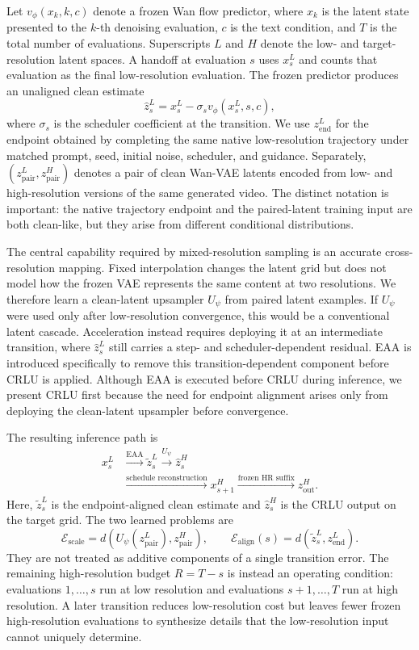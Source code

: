Let \(v_\phi(x_k,k,c)\) denote a frozen Wan flow predictor, where \(x_k\)
is the latent state presented to the \(k\)-th denoising evaluation, \(c\) is
the text condition, and \(T\) is the total number of evaluations. Superscripts
\(L\) and \(H\) denote the low- and target-resolution latent spaces. A handoff
at evaluation \(s\) uses \(x_s^L\) and counts that evaluation as the final
low-resolution evaluation. The frozen predictor produces an
unaligned clean estimate
\[
\widehat z_s^L
=x_s^L-\sigma_s v_\phi(x_s^L,s,c),
\]
where \(\sigma_s\) is the scheduler coefficient at the transition. We use
\(z_{\mathrm{end}}^L\) for the endpoint obtained by completing the same
native low-resolution trajectory under matched prompt, seed, initial noise,
scheduler, and guidance. Separately,
\((z_{\mathrm{pair}}^L,z_{\mathrm{pair}}^H)\) denotes a pair of clean Wan-VAE
latents encoded from low- and high-resolution versions of the same generated
video. The distinct notation is important: the native trajectory endpoint and
the paired-latent training input are both clean-like, but they arise from
different conditional distributions.

The central capability required by mixed-resolution sampling is an accurate
cross-resolution mapping. Fixed interpolation changes the latent grid but does
not model how the frozen VAE represents the same content at two resolutions.
We therefore learn a clean-latent upsampler \(U_\psi\) from paired latent
examples. If \(U_\psi\) were used only after low-resolution convergence, this
would be a conventional latent cascade. Acceleration instead requires deploying
it at an intermediate transition, where \(\widehat z_s^L\) still carries a
step- and scheduler-dependent residual. EAA is introduced specifically to
remove this transition-dependent component before CRLU is applied. Although
EAA is executed before CRLU during inference, we present CRLU first because the
need for endpoint alignment arises only from deploying the clean-latent
upsampler before convergence.

The resulting inference path is
\[
\begin{aligned}
x_s^L
&\xrightarrow{\text{EAA}}
\widetilde z_s^L
\xrightarrow{U_\psi}
\widehat z_s^H \\
&\xrightarrow{\text{schedule reconstruction}}
x_{s+1}^H
\xrightarrow{\text{frozen HR suffix}}
z_{\mathrm{out}}^H.
\end{aligned}
\]
Here, \(\widetilde z_s^L\) is the endpoint-aligned clean estimate and
\(\widehat z_s^H\) is the CRLU output on the target grid. The two learned
problems are
\[
\mathcal E_{\mathrm{scale}}
=d\!\left(U_\psi(z_{\mathrm{pair}}^L),z_{\mathrm{pair}}^H\right),
\qquad
\mathcal E_{\mathrm{align}}(s)
=d\!\left(\widetilde z_s^L,z_{\mathrm{end}}^L\right).
\]
They are not treated as additive components of a single transition error. The
remaining high-resolution budget \(R=T-s\) is instead an operating condition:
evaluations \(1,\ldots,s\) run at low resolution and evaluations
\(s+1,\ldots,T\) run at high resolution. A later transition reduces
low-resolution cost but leaves fewer frozen high-resolution evaluations to
synthesize details that the low-resolution input cannot uniquely determine.

